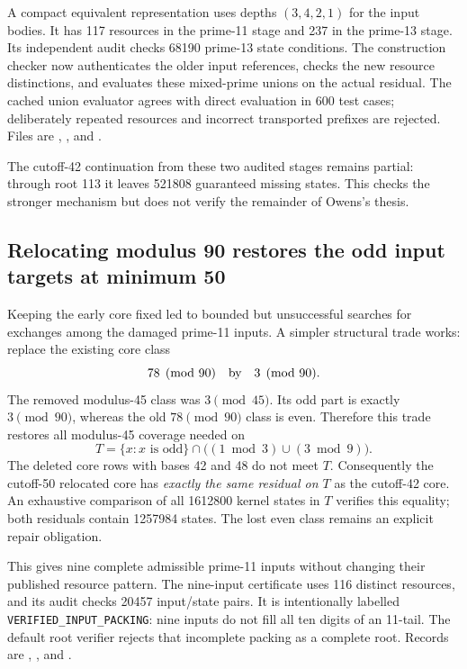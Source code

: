 \documentclass[11pt]{article}
\begin{document}
A compact equivalent representation uses depths $(3,4,2,1)$ for the input
bodies. It has 117 resources in the prime-11 stage and 237 in the prime-13
stage. Its independent audit checks 68190 prime-13 state conditions.
The construction checker now authenticates the older input references,
checks the new resource distinctions, and evaluates these mixed-prime
unions on the actual residual. The cached union evaluator agrees with
direct evaluation in 600 test cases; deliberately repeated resources and
incorrect transported prefixes are rejected. Files are
,
, and
.

The cutoff-42 continuation from these two audited stages remains partial:
through root 113 it leaves 521808 guaranteed missing states. This checks
the stronger mechanism but does not verify the remainder of Owens's thesis.

\subsection{Relocating modulus 90 restores the odd input targets at minimum 50}
Keeping the early core fixed led to bounded but unsuccessful searches for
exchanges among the damaged prime-11 inputs. A simpler structural trade
works: replace the existing core class
\[
 78\pmod{90}\quad\hbox{by}\quad3\pmod{90}.
\]
The removed modulus-45 class was $3\pmod{45}$. Its odd part is exactly
$3\pmod{90}$, whereas the old $78\pmod{90}$ class is even. Therefore this
trade restores all modulus-45 coverage needed on
\[
 T=\{x:x\text{ is odd}\}\cap
       \bigl((1\bmod3)\cup(3\bmod9)\bigr).
\]
The deleted core rows with bases 42 and 48 do not meet $T$. Consequently
the cutoff-50 relocated core has \emph{exactly the same residual on $T$}
as the cutoff-42 core. An exhaustive comparison of all 1612800 kernel
states in $T$ verifies this equality; both residuals contain 1257984 states.
The lost even class remains an explicit repair obligation.

This gives nine complete admissible prime-11 inputs without changing their
published resource pattern. The nine-input certificate uses 116 distinct
resources, and its audit checks 20457 input/state pairs. It is intentionally
labelled \texttt{VERIFIED\_INPUT\_PACKING}: nine inputs do not fill all ten
digits of an 11-tail. The default root verifier rejects that incomplete
packing as a complete root. Records are
,
, and
.
\end{document}
